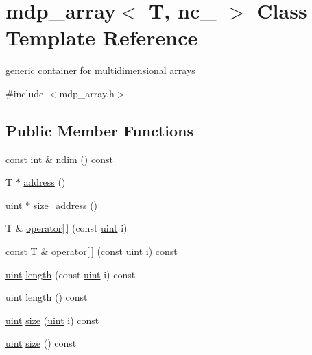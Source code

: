 \hypertarget{classmdp__array}{
\section{mdp\_\-array$<$ T, nc\_\- $>$ Class Template Reference}
\label{classmdp__array}
}


generic container for multidimensional arrays  


{\ttfamily \#include $<$mdp\_\-array.h$>$}\subsection*{Public Member Functions}
\begin{DoxyCompactItemize}
\item 
const int \& \hyperlink{classmdp__array_a20f4c81199739f0465af62c811cd60b7}{ndim} () const 
\item 
T $\ast$ \hyperlink{classmdp__array_a9b5419e65691954be0a3b6598a47366a}{address} ()
\item 
\hyperlink{mdp__global__vars_8h_a91ad9478d81a7aaf2593e8d9c3d06a14}{uint} $\ast$ \hyperlink{classmdp__array_aee0c0b97d3f8bb9d3f8ecedb77d14e6d}{size\_\-address} ()
\item 
T \& \hyperlink{classmdp__array_acc0201400e730c01bd131696ff206aa6}{operator\mbox{[}$\,$\mbox{]}} (const \hyperlink{mdp__global__vars_8h_a91ad9478d81a7aaf2593e8d9c3d06a14}{uint} i)
\item 
const T \& \hyperlink{classmdp__array_a7c6f82ec888e82f3743529ac25d42627}{operator\mbox{[}$\,$\mbox{]}} (const \hyperlink{mdp__global__vars_8h_a91ad9478d81a7aaf2593e8d9c3d06a14}{uint} i) const 
\item 
\hyperlink{mdp__global__vars_8h_a91ad9478d81a7aaf2593e8d9c3d06a14}{uint} \hyperlink{classmdp__array_a4856c3ff5dbeeb3479a531e0c505559f}{length} (const \hyperlink{mdp__global__vars_8h_a91ad9478d81a7aaf2593e8d9c3d06a14}{uint} i) const 
\item 
\hyperlink{mdp__global__vars_8h_a91ad9478d81a7aaf2593e8d9c3d06a14}{uint} \hyperlink{classmdp__array_a5e8cd60cd274b3a0e9835b66c6d430e6}{length} () const 
\item 
\hyperlink{mdp__global__vars_8h_a91ad9478d81a7aaf2593e8d9c3d06a14}{uint} \hyperlink{classmdp__array_adf2fd9006ccac4f6b1365d4018f3e513}{size} (\hyperlink{mdp__global__vars_8h_a91ad9478d81a7aaf2593e8d9c3d06a14}{uint} i) const 
\item 
\hyperlink{mdp__global__vars_8h_a91ad9478d81a7aaf2593e8d9c3d06a14}{uint} \hyperlink{classmdp__array_a236c3497ad1e959070836746302448e8}{size} () const 

\end{DoxyCompactItemize}
